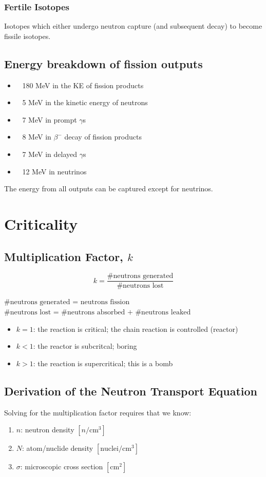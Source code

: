 \documentclass{report}
\newcommand{\h}[1]{\section*{#1}}
\newcommand{\hh}[1]{\subsection*{#1}}
\newcommand{\hhh}[1]{\subsubsection*{#1}}
\newcommand{\xs}{\sigma}
\begin{document}
\hhh{Fertile Isotopes}

Isotopes which either undergo neutron capture (and subsequent decay) to become fissile isotopes.


\hh{Energy breakdown of fission outputs}

\begin{itemize}
    \item ~ 180 MeV in the KE of fission products
    \item ~ 5 MeV in the kinetic energy of neutrons
    \item ~ 7 MeV in prompt $\gamma$s
    \item ~ 8 MeV in $\beta^{-}$ decay of fission products
    \item ~ 7 MeV in delayed $\gamma$s
    \item ~ 12 MeV in neutrinos
\end{itemize}

The energy from all outputs can be captured except for neutrinos.



\h{Criticality}


\hh{Multiplication Factor, $k$}

$$ k = \frac{\text{\# neutrons generated}}{\text{\# neutrons lost}} $$

$\text{\# neutrons generated = neutrons fission}$\\ 
$\text{\# neutrons lost = \# neutrons absorbed + \# neutrons leaked}$

\begin{itemize}
    \item $k=1$: the reaction is critical; the chain reaction is controlled (reactor)  
    \item $k<1$: the reactor is subcritcal; boring  
    \item $k>1$: the reaction is supercritical; this is a bomb  
\end{itemize}


\hh{Derivation of the Neutron Transport Equation}

Solving for the multiplication factor requires that we know: 

\begin{enumerate}
    \item $n$: neutron density $[n/\text{cm}^3]$
    \item $N$: atom/nuclide density $[\text{nuclei}/\text{cm}^3]$
    \item $\xs$: microscopic cross section $[\text{cm}^2]$
\end{enumerate}
\end{document}

